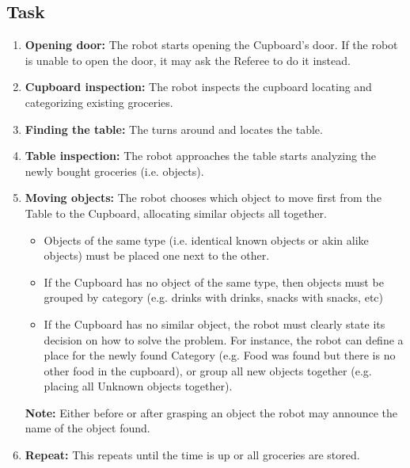 \subsection{Task}
\begin{enumerate}
	\item \textbf{Opening door:} The robot starts opening the Cupboard's door. If the robot is unable to open the door, it may ask the Referee to do it instead.
	\item \textbf{Cupboard inspection:} The robot inspects the cupboard locating and categorizing existing groceries.
	\item \textbf{Finding the table:} The turns around and locates the table.  
	\item \textbf{Table inspection:} The robot approaches the table starts analyzing the newly bought groceries (i.e. objects).
	\item \textbf{Moving objects:} The robot chooses which object to move first from the Table to the Cupboard, allocating similar objects all together.
	\begin{itemize}
		\item Objects of the same type (i.e. identical known objects or akin alike objects) must be placed one next to the other.
		\item If the Cupboard has no object of the same type, then objects must be grouped by category (e.g. drinks with drinks, snacks with snacks, etc)
		\item If the Cupboard has no similar object, the robot must clearly state its decision on how to solve the problem. For instance, the robot can define a place for the newly found Category (e.g. Food was found but there is no other food in the cupboard), or group all new objects together (e.g. placing all Unknown objects together).
	\end{itemize}

	\textbf{Note:} Either before or after grasping an object the robot may announce the name of the object found. 
	\item \textbf{Repeat:} This repeats until the time is up or all groceries are stored.
\end{enumerate}

